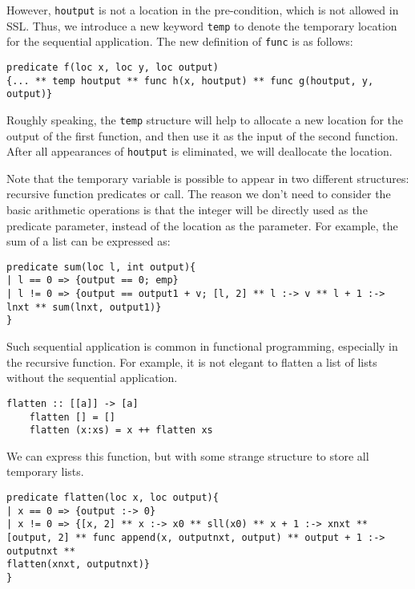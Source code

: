 However, \lstinline{houtput} is not a location in the pre-condition, which is not allowed in SSL. Thus, we introduce a new keyword \lstinline{temp} to denote the temporary location for the sequential application. The new definition of \lstinline{func} is as follows:

\begin{lstlisting}[language=SynLang]
predicate f(loc x, loc y, loc output)
{... ** temp houtput ** func h(x, houtput) ** func g(houtput, y, output)}
\end{lstlisting}

Roughly speaking, the \lstinline{temp} structure will help to allocate a new location for the output of the first function, and then use it as the input of the second function. After all appearances of \lstinline{houtput} is eliminated, we will deallocate the location.

Note that the temporary variable is possible to appear in two different structures: recursive function predicates or \func call. The reason we don't need to consider the basic arithmetic operations is that the integer will be directly used as the predicate parameter, instead of the location as the parameter. For example, the sum of a list can be expressed as:

\begin{lstlisting}[language=SynLang]
predicate sum(loc l, int output){
| l == 0 => {output == 0; emp}
| l != 0 => {output == output1 + v; [l, 2] ** l :-> v ** l + 1 :-> lnxt ** sum(lnxt, output1)}
}
\end{lstlisting}

Such sequential application is common in functional programming, especially in the recursive function. For example, it is not elegant to flatten a list of lists without the sequential application. 

\begin{lstlisting}[language=SynLang]
    flatten :: [[a]] -> [a]
    flatten [] = []
    flatten (x:xs) = x ++ flatten xs
\end{lstlisting}

We can express this function, but with some strange structure to store all temporary lists.

\begin{lstlisting}[language=SynLang]
predicate flatten(loc x, loc output){
| x == 0 => {output :-> 0}
| x != 0 => {[x, 2] ** x :-> x0 ** sll(x0) ** x + 1 :-> xnxt **
[output, 2] ** func append(x, outputnxt, output) ** output + 1 :-> outputnxt **
flatten(xnxt, outputnxt)}
}
\end{lstlisting}

